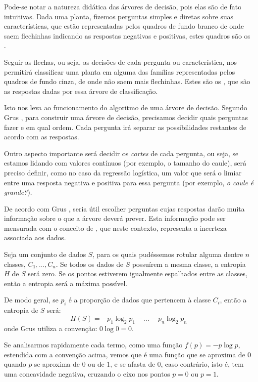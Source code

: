Pode-se notar a natureza didática das árvores de decisão, pois elas são de fato intuitivas. Dada uma planta, fizemos perguntas simples e diretas sobre suas características, que estão representadas pelos quadros de fundo branco de onde saem flechinhas indicando as respostas negativas e positivas, estes quadros são os .

Seguir as flechas, ou seja, as decisões de cada pergunta ou característica, nos permitirá classificar uma planta em alguma das famílias representadas pelos quadros de fundo cinza, de onde não saem mais flechinhas. Estes são os , que são as respostas dadas por essa árvore de classificação.

Isto nos leva ao funcionamento do algoritmo de uma árvore de decisão. Segundo Grus \citep{data}, para construir uma árvore de decisão, precisamos decidir quais perguntas fazer e em qual ordem. Cada pergunta irá separar as possibilidades restantes de acordo com as respostas. 

Outro aspecto importante será decidir os \emph{cortes} de cada pergunta, ou seja, se estamos lidando com valores contínuos (por exemplo, o tamanho do caule), será preciso definir, como no caso da regressão logística, um valor que será o limiar entre uma resposta negativa e positiva para essa pergunta (por exemplo, \emph{o caule é grande?}).

De acordo com Grus \citep{data}, seria útil escolher perguntas cujas respostas darão muita informação sobre o que a árvore deverá prever. Esta informação pode ser mensurada com o conceito de , que neste contexto, representa a incerteza associada aos dados.

Seja um conjunto de dados $S$, para os quais pudéssemos rotular alguma dentre $n$ classes, $C_1, \ldots, C_n$. Se todos os dados de $S$ possuírem a mesma classe, a entropia $H$ de $S$ será zero. Se os pontos estiverem igualmente espalhados entre as classes, então a entropia será a máxima possível.

De modo geral, se $p_i$ é a proporção de dados que pertencem à classe $C_i$, então a entropia de $S$ será:
\begin{equation}\label{eq:entropia_1}
H(S) = -p_1 \log_2 p_1 - \ldots - p_n \log_2 p_n
\end{equation}
onde Grus \citep{data} utiliza a convenção: $0 \log 0 = 0$.

Se analisarmos rapidamente cada termo, como uma função $f(p) = {-p} \log p$, estendida com a convenção acima, vemos que é uma função que se aproxima de $0$ quando $p$ se aproxima de $0$ ou de $1$, e se afasta de $0$, caso contrário, isto é, tem uma concavidade negativa, cruzando o eixo nos pontos $p=0$ ou $p=1$.

